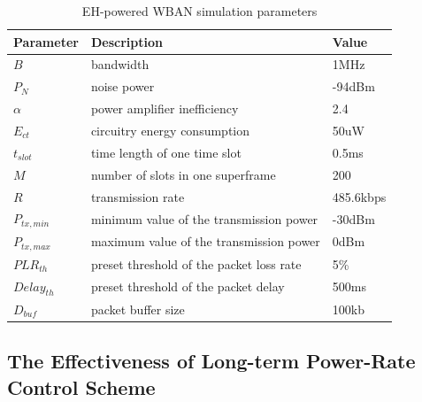 \documentclass[journal,10pt]{IEEEtran}
\begin{document}
\begin{table}[h]
\footnotesize
\centering
\caption{EH-powered WBAN simulation parameters}
 \begin{tabular}{|m{}<{\centering}| m{}<{\centering}| m{}<{\centering}|}
  \hline
  \textbf{{Parameter}} & {\textbf{Description}} & {\textbf{Value}}  \\
  \hline
   $B$ & bandwidth & 1MHz \\
  \hline
   $P_{N}$ & noise power & -94dBm \\
  \hline
   $\alpha$ & power amplifier inefficiency & 2.4 \\
  \hline
   $E_{ct}$ & circuitry energy consumption & 50uW \\
  \hline
   $t_{slot}$ &  time length of one time slot  & 0.5ms \\
		   \hline
   $M$ &  number of slots in one superframe  & 200 \\
	  \hline
   $R$ &  transmission rate  & 485.6kbps \\
	   \hline
   $P_{tx,min}$ &  minimum value of the transmission power  & -30dBm \\
	   \hline
   $P_{tx,max}$ &  maximum value of the transmission power  & 0dBm \\
   \hline
   $PLR_{th}$ &  preset threshold of the packet loss rate  & 5\% \\
   \hline
   $Delay_{th}$ &  preset threshold of the packet delay  & 500ms \\
   \hline
   $D_{buf}$ &  packet buffer size  & 100kb \\

  \hline
 \end{tabular}
\label{tab:otherPar}
\end{table}





\subsection{The Effectiveness of Long-term Power-Rate Control Scheme}
\end{document}
